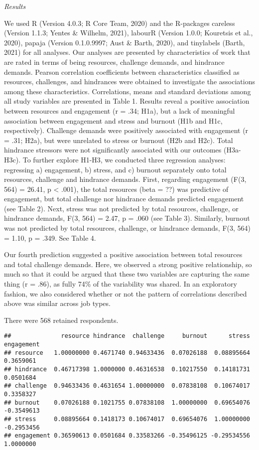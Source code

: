 \documentclass[
  man]{apa6}
\begin{document}
\emph{Results}

We used R (Version 4.0.3; R Core Team, 2020) and the R-packages careless (Version 1.1.3; Yentes \& Wilhelm, 2021), labourR (Version 1.0.0; Kouretsis et al., 2020), papaja (Version 0.1.0.9997; Aust \& Barth, 2020), and tinylabels (Barth, 2021) for all analyses. Our analyses are presented by characteristics of work that are rated in terms of being resources, challenge demands, and hindrance demands. Pearson correlation coefficients between characteristics classified as resources, challenges, and hindrances were obtained to investigate the associations among these characteristics.
Correlations, means and standard deviations among all study variables are presented in Table 1. Results reveal a positive association between resources and engagement (r = .34; H1a), but a lack of meaningful association between engagement and stress and burnout (H1b and H1c, respectively). Challenge demands were positively associated with engagement (r = .31; H2a), but were unrelated to stress or burnout (H2b and H2c). Total hindrance stressors were not significantly associated with our outcomes (H3a-H3c). To further explore H1-H3, we conducted three regression analyses: regressing a) engagement, b) stress, and c) burnout separately onto total resources, challenge and hindrance demands. First, regarding engagement (F(3, 564) = 26.41, p \textless{} .001), the total resources (beta = ??) was predictive of engagement, but total challenge nor hindrance demands predicted engagement (see Table 2). Next, stress was not predicted by total resources, challenge, or hindrance demands, F(3, 564) = 2.47, p = .060 (see Table 3). Similarly, burnout was not predicted by total resources, challenge, or hindrance demands, F(3, 564) = 1.10, p = .349. See Table 4.

Our fourth prediction suggested a positive association between total resources and total challenge demands. Here, we observed a strong positive relationship, so much so that it could be argued that these two variables are capturing the same thing (r = .86), as fully 74\% of the variability was shared.
In an exploratory fashion, we also considered whether or not the pattern of correlations described above was similar across job types.

There were 568 retained respondents.

\begin{verbatim}
##              resource hindrance  challenge     burnout      stress engagement
## resource   1.00000000 0.4671740 0.94633436  0.07026188  0.08895664  0.3659061
## hindrance  0.46717398 1.0000000 0.46316538  0.10217550  0.14181731  0.0501684
## challenge  0.94633436 0.4631654 1.00000000  0.07838108  0.10674017  0.3358327
## burnout    0.07026188 0.1021755 0.07838108  1.00000000  0.69654076 -0.3549613
## stress     0.08895664 0.1418173 0.10674017  0.69654076  1.00000000 -0.2953456
## engagement 0.36590613 0.0501684 0.33583266 -0.35496125 -0.29534556  1.0000000
\end{verbatim}
\end{document}
